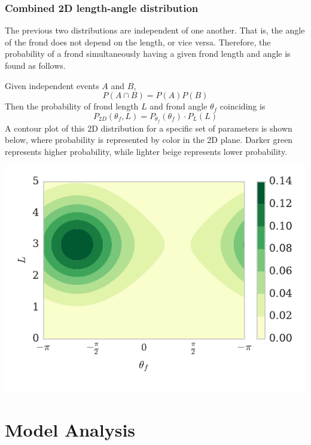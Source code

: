 \documentclass{article}
\newenvironment{mcfig}
	{\par\medskip\noindent\minipage{\linewidth}}
	{\endminipage\par\medskip}
\begin{document}
\begin{multicols}{2}
\subsubsection{Combined 2D length-angle distribution}
The previous two distributions are independent of one another. That is, the angle of the frond does not depend on the length, or vice versa.
Therefore, the probability of a frond simultaneously having a given frond length and angle is found as follows.

Given independent events $A$ and $B$,
\begin{equation}
	P(A \cap B) = P(A)P(B)
\end{equation}
Then the probability of frond length $L$ and frond angle $\theta_f$ coinciding is 
\begin{equation}
	P_{2D}(\theta_f,L) = P_{\theta_f}(\theta_f) \cdot P_L(L)
\end{equation}
A contour plot of this 2D distribution for a specific set of parameters is shown below, where probability is represented by color in the 2D plane. Darker green represents higher probability, while lighter beige represents lower probability.

\begin{mcfig}
	\centering
	\includegraphics[width=\linewidth]{prob_2d}
	\label{fig:dist_2d}
\end{mcfig}

\section{Model Analysis}

\end{multicols}
\end{document}
